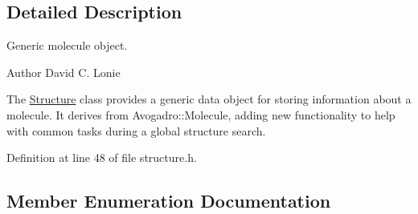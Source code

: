 \subsection{Detailed Description}
Generic molecule object. 

\begin{DoxyAuthor}{Author}
David C. Lonie
\end{DoxyAuthor}
The \hyperlink{classGlobalSearch_1_1Structure}{Structure} class provides a generic data object for storing information about a molecule. It derives from Avogadro\+::\+Molecule, adding new functionality to help with common tasks during a global structure search. 

Definition at line 48 of file structure.\+h.



\subsection{Member Enumeration Documentation}
\hypertarget{classGlobalSearch_1_1Structure_a3f1e44cb4f603fe1b3fbc8e813535917}{}
